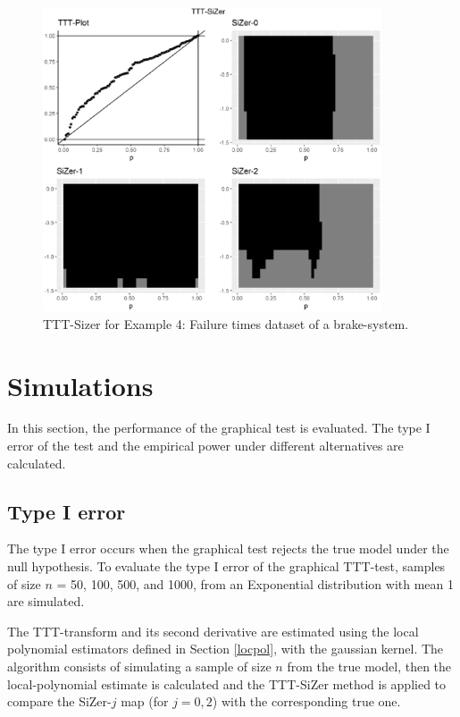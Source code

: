 \documentclass[preprint,12pt]{elsarticle}
\begin{document}
\begin{figure}[htb]
\begin{center}
\includegraphics[height= 9cm]{Fig5_brakes_log10}%
\caption{TTT-Sizer for Example 4: Failure times dataset of a brake-system.}\label{Fig:brakes}
\end{center}
\end{figure}
%

\section{Simulations}\label{sec:sim}
In this section, the performance of the graphical test is evaluated. The type I error of the test and the empirical power under different alternatives are calculated.


\subsection{Type I error}
The type I error occurs when the graphical test rejects the true model under the null hypothesis. To evaluate the type I error of the graphical TTT-test, samples of size $n$ = 50, 100, 500, and 1000, from an Exponential distribution with mean 1 are simulated.

The TTT-transform and its second derivative are estimated using the local polynomial estimators defined in Section \ref{locpol}, with the gaussian kernel.  
The algorithm consists of simulating a sample of size $n$ from the true model, then the local-polynomial estimate is calculated and the TTT-SiZer method is applied to compare the SiZer-$j$ map (for $j=0,2$) with the corresponding true one.
\end{document}
